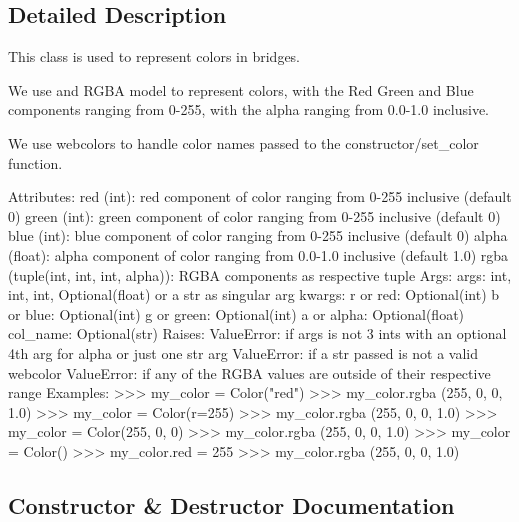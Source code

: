 \subsection{Detailed Description}
\begin{DoxyVerb}This class is used to represent colors in bridges.

We use and RGBA model to represent colors, with the Red Green and Blue components ranging from 0-255,
with the alpha ranging from 0.0-1.0 inclusive.

We use webcolors to handle color names passed to the constructor/set_color function.

Attributes:
    red (int): red component of color ranging from 0-255 inclusive (default 0)
    green (int): green component of color ranging from 0-255 inclusive (default 0)
    blue (int): blue component of color ranging from 0-255 inclusive (default 0)
    alpha (float): alpha component of color ranging from 0.0-1.0 inclusive (default 1.0)
    rgba (tuple(int, int, int, alpha)): RGBA components as respective tuple
Args:
    args: int, int, int, Optional(float) or a str as singular arg
    kwargs:
        r or red: Optional(int)
        b or blue: Optional(int)
        g or green: Optional(int)
        a or alpha: Optional(float)
        col_name: Optional(str)
Raises:
    ValueError: if args is not 3 ints with an optional 4th arg for alpha or just one str arg
    ValueError: if a str passed is not a valid webcolor
    ValueError: if any of the RGBA values are outside of their respective range
Examples:
    >>> my_color = Color("red")
    >>> my_color.rgba
    (255, 0, 0, 1.0)
    >>> my_color = Color(r=255)
    >>> my_color.rgba
    (255, 0, 0, 1.0)
    >>> my_color = Color(255, 0, 0)
    >>> my_color.rgba
    (255, 0, 0, 1.0)
    >>> my_color = Color()
    >>> my_color.red = 255
    >>> my_color.rgba
    (255, 0, 0, 1.0)
\end{DoxyVerb}
 

\subsection{Constructor \& Destructor Documentation}
\hypertarget{class_bridges_1_1color_1_1_color_ab66face8abc6657a93f5c0ed05911994}{}

